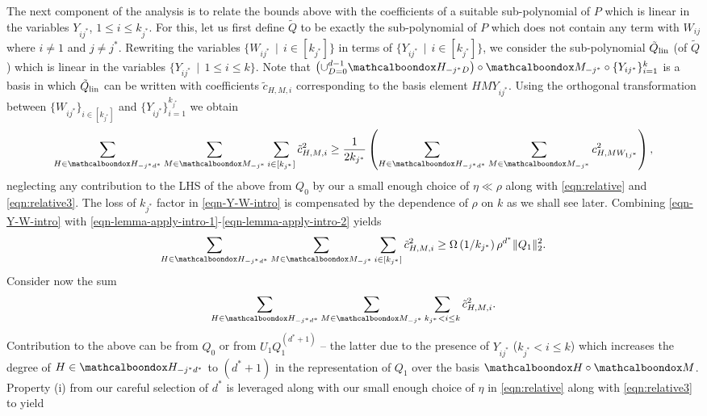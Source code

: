 The next component of the analysis is to relate the bounds above with
the coefficients of
a suitable sub-polynomial of $P$ which is linear in the
variables $Y_{ij^*}$, $1 \leq i \leq k_{j^*}$. For this, let us first define
$\tilde{Q}$ to be exactly the sub-polynomial of $P$ 
 which does not contain any term with $W_{ij}$ where $i \neq
1$ and $j \neq j^*$. Rewriting the variables $\{W_{ij^*}\,\mid\, i \in
[k_{j^*}]\}$ in terms of $\{Y_{ij^*}\,\mid\, i \in [k_{j^*}]\}$, we
consider the sub-polynomial $\tilde{Q}_{\textnormal{lin}}$ (of $\tilde{Q}$) which is linear in the
variables $\{Y_{ij^*}\,\mid\, 1\leq i \leq k\}$. Note that
$\left(\cup_{D=0}^{d-1}\mcb{H}_{-j^*D}\right)\circ \mcb{M}_{-j^*}\circ\{Y_{ij^*}\}_{i=1}^k$ is a
basis in which $\tilde{Q}_{\textnormal{lin}}$ can be written with 
coefficients $\tilde{c}_{H, M, i}$ corresponding to the basis element
$HMY_{ij^*}$. Using the orthogonal transformation between
$\{W_{ij^*}\}_{i\in [k_{j^*}]}$ and $\{Y_{ij^*}\}_{i=1}^{k_{j^*}}$ we obtain
\begin{equation} \label{eqn-Y-W-intro}
\sum_{H\in \mcb{H}_{-j^*d^*}}\sum_{M \in \mcb{M}_{-j^*}}\sum_{i \in
[k_{j^*}]} \tilde{c}_{H,M,i}^2 \geq \frac{1}{2k_{j^*}} \left(
\sum_{H \in \mcb{H}_{-j^*d^*}}\sum_{M \in \mcb{M}_{-j^*}}
c^2_{H,MW_{1j^*}} \right),
\end{equation}
neglecting any contribution to the LHS of the above from $Q_0$ by our
a small enough choice of $\eta \ll \rho$ along with
\eqref{eqn:relative} and \eqref{eqn:relative3}.
The loss of $k_{j^*}$ factor in \eqref{eqn-Y-W-intro} is
compensated by the dependence of $\rho$ on $k$ as we shall see later. 
Combining
\eqref{eqn-Y-W-intro} with
\eqref{eqn-lemma-apply-intro-1}-\eqref{eqn-lemma-apply-intro-2} yields
\begin{equation}\label{eqn-non-noise-bd-intro}
\sum_{H\in \mcb{H}_{-j^*d^*}}\sum_{M \in \mcb{M}_{-j^*}}\sum_{i \in
[k_{j^*}]} \tilde{c}_{H,M,i}^2 \geq \Omega\left(1/k_{j^*}\right)
\rho^{d^*} \|Q_1\|_2^2.
\end{equation}
Consider now the sum 
$$\sum_{H\in \mcb{H}_{-j^*d^*}}\sum_{M \in
\mcb{M}_{-j^*}}\sum_{k_{j^*} < i \leq k} \tilde{c}_{H,M,i}^2.$$ 
Contribution
to the above can be from $Q_0$ or from $U_1Q_1^{(d^*+1)}$ -- the latter
due to the presence of $Y_{ij^*}$ ($k_{j^*} < i \leq k$) which
increases
the degree of $H \in \mcb{H}_{-j^*d^*}$ to $(d^* + 1)$ in the
representation of $Q_1$ over the basis $\mcb{H}\circ\mcb{M}$. 
Property (i) from our careful selection of $d^*$ is leveraged along with
our small enough choice of $\eta$ in \eqref{eqn:relative} along with
\eqref{eqn:relative3} to yield
